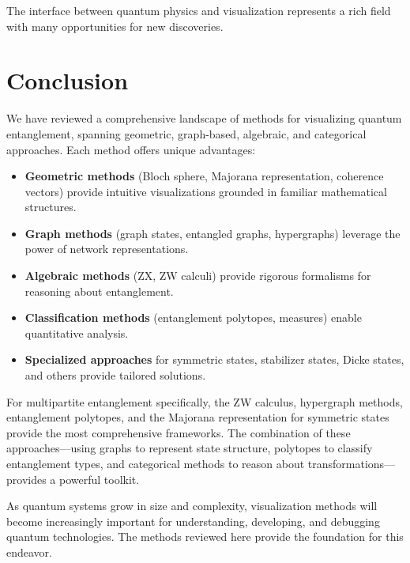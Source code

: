 \documentclass[12pt,a4paper]{article}
\begin{document}
The interface between quantum physics and visualization represents a rich field with many opportunities for new discoveries.

\section{Conclusion}
\label{sec:conclusion}

We have reviewed a comprehensive landscape of methods for visualizing quantum entanglement, spanning geometric, graph-based, algebraic, and categorical approaches. Each method offers unique advantages:

\begin{itemize}
	\item \textbf{Geometric methods} (Bloch sphere, Majorana representation, coherence vectors) provide intuitive visualizations grounded in familiar mathematical structures.
	\item \textbf{Graph methods} (graph states, entangled graphs, hypergraphs) leverage the power of network representations.
	\item \textbf{Algebraic methods} (ZX, ZW calculi) provide rigorous formalisms for reasoning about entanglement.
	\item \textbf{Classification methods} (entanglement polytopes, measures) enable quantitative analysis.
	\item \textbf{Specialized approaches} for symmetric states, stabilizer states, Dicke states, and others provide tailored solutions.
\end{itemize}

For multipartite entanglement specifically, the ZW calculus, hypergraph methods, entanglement polytopes, and the Majorana representation for symmetric states provide the most comprehensive frameworks. The combination of these approaches---using graphs to represent state structure, polytopes to classify entanglement types, and categorical methods to reason about transformations---provides a powerful toolkit.

As quantum systems grow in size and complexity, visualization methods will become increasingly important for understanding, developing, and debugging quantum technologies. The methods reviewed here provide the foundation for this endeavor.
\end{document}
